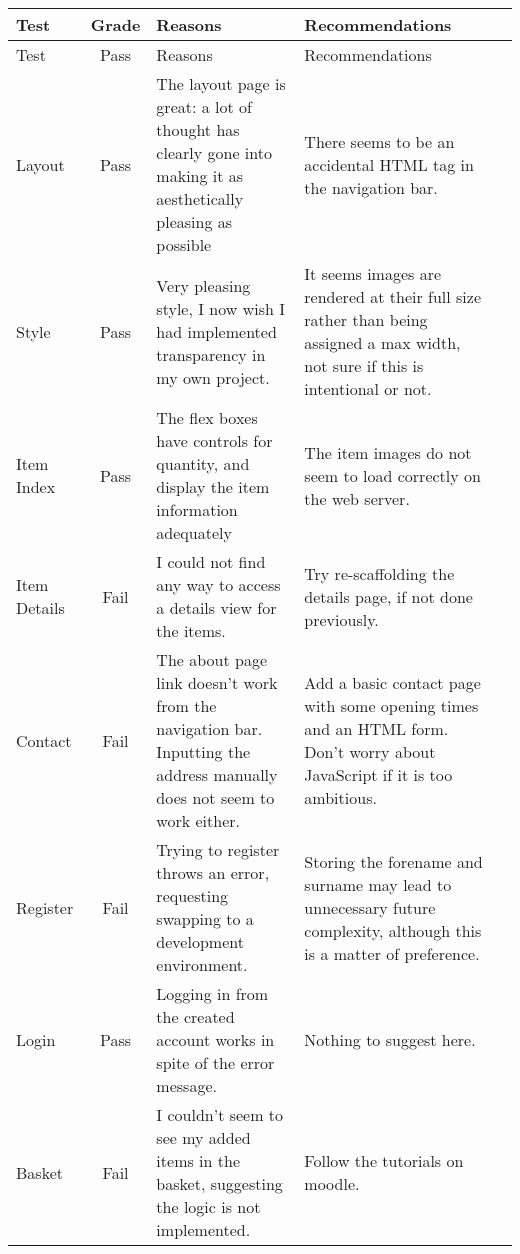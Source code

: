 \documentclass{article}
\begin{document}
  \begin{adjustwidth}{-2cm}{-2cm}
  \begin{center} %
    \begin{longtable}{|p{1.2cm}|c|p{5cm}|p{5cm}|c|}
      \hline Test & Grade & Reasons & Recommendations \\ \hline 
      \endfirsthead
      
      \hline Test & Pass & Reasons & Recommendations \\ \hline 
      \endhead

      Layout & Pass & 
      The layout page is great: a lot of thought has clearly gone into making it as aesthetically pleasing as possible &
      There seems to be an accidental HTML tag in the navigation bar. \\ \hline 

      Style & Pass & 
      Very pleasing style, I now wish I had implemented transparency in my own project. &
      It seems images are rendered at their full size rather than being assigned a max width, not sure if this is intentional or not. \\ \hline
     
      Item Index & Pass &
      The flex boxes have controls for quantity, and display the item information adequately &
      The item images do not seem to load correctly on the web server. \\ \hline

      Item Details & Fail &
      I could not find any way to access a details view for the items. &
      Try re-scaffolding the details page, if not done previously. \\ \hline
      
      Contact & Fail &
      The about page link doesn't work from the navigation bar. Inputting the address manually does not seem to work either. &
      Add a basic contact page with some opening times and an HTML form. Don't worry about JavaScript if it is too ambitious. \\ \hline
      
      Register & Fail &
      Trying to register throws an error, requesting swapping to a development environment. &
      Storing the forename and surname may lead to unnecessary future complexity, although this is a matter of preference. \\ \hline
      
      Login & Pass &
      Logging in from the created account works in spite of the error message. &
      Nothing to suggest here. \\ \hline
           
      Basket & Fail &
      I couldn't seem to see my added items in the basket, suggesting the logic is not implemented. &
      Follow the tutorials on moodle. \\ \hline

    \end{longtable}
  \end{center}
\end{adjustwidth}
\end{document}
